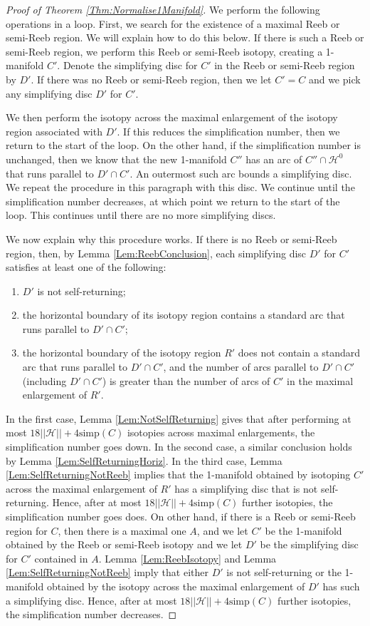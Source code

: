 \documentclass[10pt,a4paper]{amsart}
\newcommand{\calH}{\mathcal{H}}
\begin{document}
\begin{proof}[Proof of Theorem \ref{Thm:Normalise1Manifold}]
We perform the following operations in a loop. First, we search for the existence of a maximal Reeb or semi-Reeb region. We will explain how to do this below. If there is such a Reeb or semi-Reeb region, we perform this Reeb or semi-Reeb isotopy, creating a 1-manifold $C'$. Denote the simplifying disc for $C'$ in the Reeb or semi-Reeb region by $D'$. 
If there was no Reeb or semi-Reeb region, then we let $C' = C$ and we pick any simplifying disc $D'$ for $C'$. 

We then perform the isotopy across the maximal enlargement of the isotopy region associated with $D'$. If this reduces the simplification number, then we return to the start of the loop. On the other hand, if the simplification number is unchanged, then we know that the new 1-manifold $C''$ has an arc of $C'' \cap \calH^0$ that runs parallel to $D' \cap C'$. An outermost such arc bounds a simplifying disc. We repeat the procedure in this paragraph with this disc. We continue until the simplification number decreases, at which point we return to the start of the loop. This continues until there are no more simplifying discs.

We now explain why this procedure works. If there is no Reeb or semi-Reeb region, then, by Lemma \ref{Lem:ReebConclusion}, each simplifying disc $D'$ for $C'$ satisfies at least one of the following: 
\begin{enumerate}
\item $D'$ is not self-returning;
\item the horizontal boundary of its isotopy region contains a standard arc that runs parallel to $D' \cap C'$;
\item the horizontal boundary of the isotopy region $R'$ does not contain a standard arc that runs parallel to $D' \cap C'$, and the number of arcs parallel to $D' \cap C'$ (including $D' \cap C'$) is greater than the number of arcs of $C'$ in the maximal enlargement of $R'$.
\end{enumerate}
In the first case, Lemma \ref{Lem:NotSelfReturning} gives that after performing at most $18||\calH|| + 4\mathrm{simp}(C)$ isotopies across maximal enlargements, the simplification number goes down. In the second case, a similar conclusion holds by Lemma \ref{Lem:SelfReturningHoriz}. In the third case, Lemma \ref{Lem:SelfReturningNotReeb} implies that the 1-manifold obtained by isotoping $C'$ across the maximal enlargement of $R'$ has a simplifying disc that is not self-returning. Hence, after at most $18||\calH|| + 4\mathrm{simp}(C)$ further isotopies, the simplification number goes does.
On other hand, if there is a Reeb or semi-Reeb region for $C$, then there is a maximal one $A$, and we let $C'$ be the 1-manifold obtained by the Reeb or semi-Reeb isotopy and we let $D'$ be the simplifying disc for $C'$ contained in $A$. Lemma \ref{Lem:ReebIsotopy} and Lemma \ref{Lem:SelfReturningNotReeb} imply that either $D'$ is not self-returning or the 1-manifold obtained by the isotopy across the maximal enlargement of $D'$ has such a simplifying disc. Hence, after at most $18||\calH|| + 4\mathrm{simp}(C)$ further isotopies, the simplification number decreases.


\end{proof}
\end{document}
